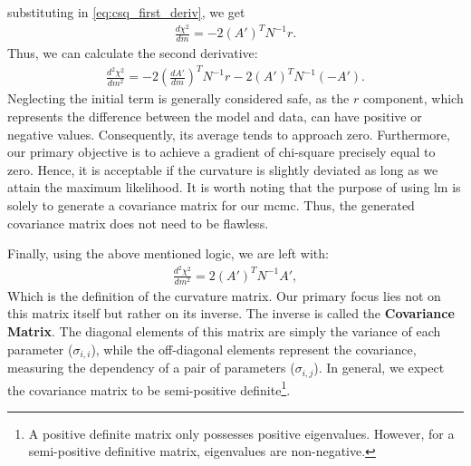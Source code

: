 \documentclass[12pt, TexShade, letterpaper]{report}
\begin{document}
substituting in \ref{eq:csq_first_deriv}, we get
\begin{align}
    \frac{d \chi^2}{dm} = -2 \left(A'\right)^T N^{-1} r.
\end{align}
Thus, we can calculate the second derivative:
\begin{align}
    \frac{d^2 \chi^2}{dm^2} = -2 \left(\frac{dA'}{dm}\right)^T N^{-1} r -2 \left(A'\right) ^T N^{-1} \left(-A'\right).
\end{align}
Neglecting the initial term is generally considered safe, as the $r$ component, which represents the difference between the model and data, can have positive or negative values. Consequently, its average tends to approach zero. Furthermore, our primary objective is to achieve a gradient of chi-square precisely equal to zero. Hence, it is acceptable if the curvature is slightly deviated as long as we attain the maximum likelihood. It is worth noting that the purpose of using \gls{lm} is solely to generate a covariance matrix for our \gls{mcmc}. Thus, the generated covariance matrix does not need to be flawless.

Finally, using the above mentioned logic, we are left with:
\begin{align}
         \frac{d^2 \chi^2}{dm^2} = 2 \left(A'\right)^T N^{-1} A' ,\label{eq:csq_second_deriv}
\end{align}
Which is the definition of the curvature matrix. Our primary focus lies not on this matrix itself but rather on its inverse. The inverse is called the \textbf{Covariance Matrix}. The diagonal elements of this matrix are simply the variance of each parameter ($\sigma_{i, i}$), while the off-diagonal elements represent the covariance, measuring the dependency of a pair of parameters ($\sigma_{i, j}$). In general, we expect the covariance matrix to be semi-positive definite\footnote{A positive definite matrix only possesses positive eigenvalues. However, for a semi-positive definitive matrix, eigenvalues are non-negative.}.\par
\end{document}
